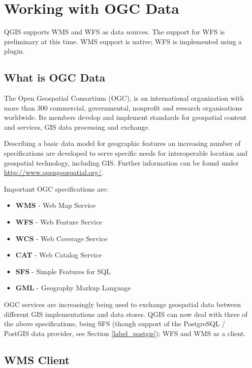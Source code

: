 \section{Working with OGC Data}

QGIS supports WMS and WFS as data sources. The support for WFS is preliminary 
at this time. WMS support is native; WFS is implemented using a plugin.

\subsection{What is OGC Data}

The Open Geospatial Consortium (OGC), is an international organization with more than 300 
commercial, governmental, nonprofit and research organisations worldwide. Its members 
develop and implement standards for geospatial content and services, GIS data processing 
and exchange.

Describing a basic data model for geographic features an increasing number of specifications 
are developed to serve specific needs for interoperable location and geospatial technology, 
including GIS. Further information can be found under \url{http://www.opengeospatial.org/}.

Important OGC specifications are:

\begin{itemize}
\item \textbf{WMS} - Web Map Service
\item \textbf{WFS} - Web Feature Service
\item \textbf{WCS} - Web Coverage Service
\item \textbf{CAT} - Web Catalog Service
\item \textbf{SFS} - Simple Features for SQL
\item \textbf{GML} - Geography Markup Language
\end{itemize}

OGC services are increasingly being used to exchange geospatial data between
different GIS implementations and data stores.  QGIS can now deal with three of the
above specifications, being SFS (though support of the PostgreSQL / PostGIS
data provider, see Section \ref{label_postgis}); WFS and WMS as a client.

\subsection{WMS Client}\label{sec:ogc-wms}

